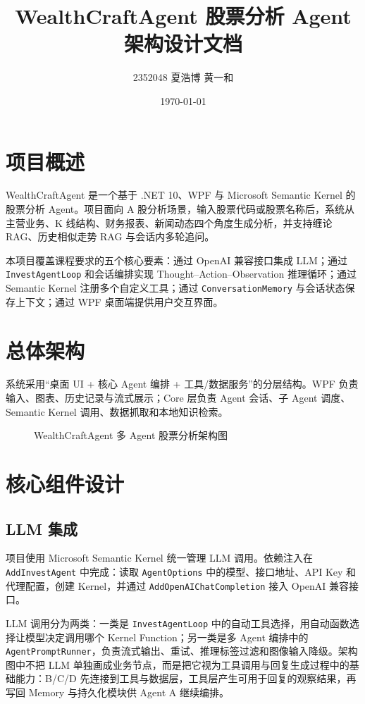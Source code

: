 \documentclass[UTF8,a4paper,11pt]{ctexart}
\title{\heiti WealthCraftAgent 股票分析 Agent 架构设计文档}
\author{2352048 夏浩博 \quad 2351269 黄一和}
\date{\today}
\begin{document}
\maketitle

\section{项目概述}
WealthCraftAgent 是一个基于 .NET 10、WPF 与 Microsoft Semantic Kernel 的股票分析 Agent。项目面向 A 股分析场景，输入股票代码或股票名称后，系统从主营业务、K 线结构、财务报表、新闻动态四个角度生成分析，并支持缠论 RAG、历史相似走势 RAG 与会话内多轮追问。

本项目覆盖课程要求的五个核心要素：通过 OpenAI 兼容接口集成 LLM；通过 \texttt{InvestAgentLoop} 和会话编排实现 Thought--Action--Observation 推理循环；通过 Semantic Kernel 注册多个自定义工具；通过 \texttt{ConversationMemory} 与会话状态保存上下文；通过 WPF 桌面端提供用户交互界面。

\section{总体架构}
系统采用“桌面 UI + 核心 Agent 编排 + 工具/数据服务”的分层结构。WPF 负责输入、图表、历史记录与流式展示；Core 层负责 Agent 会话、子 Agent 调度、Semantic Kernel 调用、数据抓取和本地知识检索。

\begin{figure}[htbp]
\centering
\resizebox{\textwidth}{!}{
}
\caption{WealthCraftAgent 多 Agent 股票分析架构图}
\end{figure}

\section{核心组件设计}
\subsection{LLM 集成}
项目使用 Microsoft Semantic Kernel 统一管理 LLM 调用。依赖注入在 \texttt{AddInvestAgent} 中完成：读取 \texttt{AgentOptions} 中的模型、接口地址、API Key 和代理配置，创建 Kernel，并通过 \texttt{AddOpenAIChatCompletion} 接入 OpenAI 兼容接口。

LLM 调用分为两类：一类是 \texttt{InvestAgentLoop} 中的自动工具选择，用自动函数选择让模型决定调用哪个 Kernel Function；另一类是多 Agent 编排中的 \texttt{AgentPromptRunner}，负责流式输出、重试、推理标签过滤和图像输入降级。架构图中不把 LLM 单独画成业务节点，而是把它视为工具调用与回复生成过程中的基础能力：B/C/D 先连接到工具与数据层，工具层产生可用于回复的观察结果，再写回 Memory 与持久化模块供 Agent A 继续编排。
\end{document}
